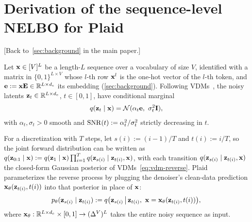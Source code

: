 \documentclass{article}
\begin{document}

    


    


\section{Derivation of the sequence-level NELBO for Plaid}
\label{supp:nelbo-derivation}

[Back to~\cref{sec:background} in the main paper.]

%
%

Let ${\mathbf x}\in [V]^L$ be a length-$L$ sequence over a vocabulary of size $V$, identified with a matrix in $\{0, 1\}^{L \times V}$ whose $l$-th row ${\mathbf x}^l$ is the one-hot vector of the $l$-th token, and ${\mathbf e}:={\mathbf x}{\mathbf E}\in\mathbb{R}^{L\times d_e}$ its embedding (\cref{sec:background}). Following VDMs~\citep{kingma2021variational}, the noisy latents ${\mathbf z}_t\in\mathbb{R}^{L\times d_e}$, $t\in[0,1]$, have conditional marginal
\begin{align*}
    q({\mathbf z}_t \mid {\mathbf x}) = \mathcal{N}(\alpha_t {\mathbf e},\ \sigma_t^2 {\mathbf I}),
\end{align*}
with $\alpha_t,\sigma_t>0$ smooth and ${\mathrm{SNR}}(t):=\alpha_t^2/\sigma_t^2$ strictly decreasing in $t$.

For a discretization with $T$ steps, let $s(i):=(i-1)/T$ and $t(i):=i/T$, so the joint forward distribution can be written as $q({\mathbf z}_{0:1}\mid{\mathbf x}):=q({\mathbf z}_1\mid{\mathbf x})\prod_{i=1}^T q({\mathbf z}_{s(i)}\mid{\mathbf z}_{t(i)},{\mathbf x})$, with each transition $q({\mathbf z}_{s(i)}\mid{\mathbf z}_{t(i)},{\mathbf x})$ the closed-form Gaussian posterior of VDMs~\cref{eq:vdm-reverse}. Plaid parameterizes the reverse process by plugging the denoiser's clean-data prediction ${\mathbf x}_\theta({\mathbf z}_{t(i)}, t(i))$ into that posterior in place of ${\mathbf x}$:
\begin{align}\label{eq:plaid-parameterization}
    p_\theta({\mathbf z}_{s(i)}\mid{\mathbf z}_{t(i)}) := q\bigl({\mathbf z}_{s(i)}\,\big|\,{\mathbf z}_{t(i)},\ {\mathbf x} = {\mathbf x}_\theta({\mathbf z}_{t(i)}, t(i))\bigr),
\end{align}
where ${\mathbf x}_\theta:\mathbb{R}^{L\times d_e}\times[0,1]\to(\Delta^V)^L$ takes the entire noisy sequence as input.
\end{document}
